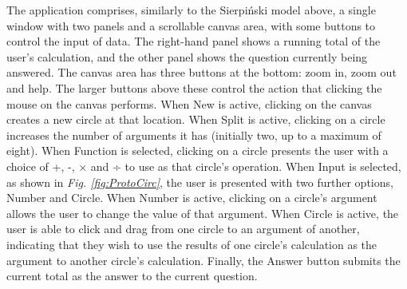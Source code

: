 \documentclass[12pt,twoside,notitlepage,xetex]{report}
\begin{document}
The application comprises, similarly to the Sierpiński model above, a single
window with two panels and a scrollable canvas area, with some buttons to
control the input of data.  The right-hand panel shows a running total of the
user's calculation, and the other panel shows the question currently being
answered.  The canvas area has three buttons at the bottom: zoom in, zoom out
and help.  The larger buttons above these control the action that clicking the
mouse on the canvas performs.  When {\sfapp New} is active, clicking on the
canvas creates a new circle at that location.  When {\sfapp Split} is active,
clicking on a circle increases the number of arguments it has (initially two,
up to a maximum of eight).  When {\sfapp Function} is selected, clicking on a
circle presents the user with a choice of +, -, × and ÷ to use as that circle's
operation.  When {\sfapp Input} is selected, as shown in \emph{Fig. \ref{fig:ProtoCirc}}, the
user is presented with two further options, {\sfapp Number} and
{\sfapp Circle}.  When {\sfapp Number} is active, clicking on a circle's
argument allows the user to change the value of that argument.  When
{\sfapp Circle} is active, the user is able to click and drag from one circle
to an argument of another, indicating that they wish to use the results of one
circle's calculation as the argument to another circle's calculation.  Finally,
the {\sfapp Answer} button submits the current total as the answer to the
current question.
\end{document}
